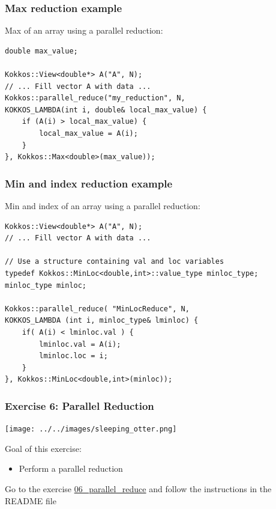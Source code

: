 \documentclass[aspectratio=169]{beamer}
\begin{document}

\begin{frame}[fragile]
    \frametitle{Max reduction example}

Max of an array using a parallel reduction:

\footnotesize
\begin{verbatim}
double max_value;

Kokkos::View<double*> A("A", N);
// ... Fill vector A with data ...
Kokkos::parallel_reduce("my_reduction", N,
KOKKOS_LAMBDA(int i, double& local_max_value) {
    if (A(i) > local_max_value) {
        local_max_value = A(i);
    }
}, Kokkos::Max<double>(max_value));
\end{verbatim}

\end{frame}


\begin{frame}[fragile]
    \frametitle{Min and index reduction example}

Min and index of an array using a parallel reduction:

\footnotesize
\begin{verbatim}
Kokkos::View<double*> A("A", N);
// ... Fill vector A with data ...

// Use a structure containing val and loc variables
typedef Kokkos::MinLoc<double,int>::value_type minloc_type;
minloc_type minloc;

Kokkos::parallel_reduce( "MinLocReduce", N,
KOKKOS_LAMBDA (int i, minloc_type& lminloc) {
    if( A(i) < lminloc.val ) {
        lminloc.val = A(i);
        lminloc.loc = i;
    }
}, Kokkos::MinLoc<double,int>(minloc));
\end{verbatim}

\end{frame}


\begin{frame}[fragile]
    \frametitle{Exercise 6: Parallel Reduction} 

    \begin{center}
    \texttt{[image: ../../images/sleeping\_otter.png]}
    \end{center}

    Goal of this exercise:

    \begin{itemize}
        \item Perform a parallel reduction
    \end{itemize}

    \begin{block}{}
        Go to the exercise \href{https://github.com/CExA-project/cexa-kokkos-tutorials/tree/main/exercises/06_parallel_reduce}{06\_parallel\_reduce} and follow the instructions in the README file
    \end{block}

\end{frame}
\end{document}
